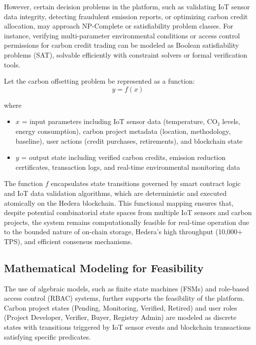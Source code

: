 \documentclass[oneside,a4paper,12pt]{book}
\begin{document}
\begin{appendices}
However, certain decision problems in the platform, such as validating IoT sensor data integrity, detecting fraudulent emission reports, or optimizing carbon credit allocation, may approach NP-Complete or satisfiability problem classes. For instance, verifying multi-parameter environmental conditions or access control permissions for carbon credit trading can be modeled as Boolean satisfiability problems (SAT), solvable efficiently with constraint solvers or formal verification tools.

Let the carbon offsetting problem be represented as a function:
\begin{equation}
y = f(x)
\end{equation}

where
\begin{itemize}
\item $x$ = input parameters including IoT sensor data (temperature, CO₂ levels, energy consumption), carbon project metadata (location, methodology, baseline), user actions (credit purchases, retirements), and blockchain state
\item $y$ = output state including verified carbon credits, emission reduction certificates, transaction logs, and real-time environmental monitoring data
\end{itemize}

The function $f$ encapsulates state transitions governed by smart contract logic and IoT data validation algorithms, which are deterministic and executed atomically on the Hedera blockchain. This functional mapping ensures that, despite potential combinatorial state spaces from multiple IoT sensors and carbon projects, the system remains computationally feasible for real-time operation due to the bounded nature of on-chain storage, Hedera's high throughput (10,000+ TPS), and efficient consensus mechanisms.

\subsection{Mathematical Modeling for Feasibility}
The use of algebraic models, such as finite state machines (FSMs) and role-based access control (RBAC) systems, further supports the feasibility of the platform. Carbon project states (Pending, Monitoring, Verified, Retired) and user roles (Project Developer, Verifier, Buyer, Registry Admin) are modeled as discrete states with transitions triggered by IoT sensor events and blockchain transactions satisfying specific predicates.


\end{appendices}
\end{document}
